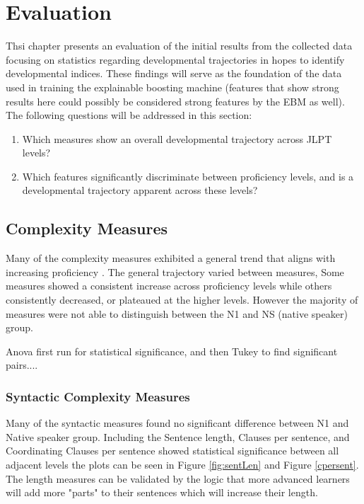 \chapter{Evaluation} 
Thsi chapter presents an evaluation of the initial results from the collected data focusing on statistics regarding
developmental trajectories in hopes to identify developmental indices. These findings will serve as the foundation
of the data used in training the explainable boosting machine (features that show strong results here could possibly
be considered strong features by the EBM as well). The following questions will be addressed in this
section:

\begin{enumerate}
    \item Which measures show an overall developmental trajectory across JLPT levels?
    \item Which features significantly discriminate between proficiency levels, and is a developmental trajectory
    apparent across these levels?
\end{enumerate}

\section{Complexity Measures}

Many of the complexity measures exhibited a general trend that aligns with increasing proficiency . The general
trajectory varied between measures, Some measures
showed a consistent increase across proficiency levels while others consistently decreased, or plateaued at the
higher levels. However the majority of measures were not able to distinguish between the N1 and NS (native speaker)
group.

Anova first run for statistical significance, and then Tukey to find significant pairs....

\subsection{Syntactic Complexity Measures}



Many of the syntactic measures found no significant difference between N1 and Native speaker group. Including the
 Sentence length, Clauses per sentence, and Coordinating Clauses per sentence showed statistical significance
between all
adjacent levels the plots can be seen in Figure \ref{fig:sentLen} and Figure \ref{cpersent}. The length measures can be
validated by
the
logic
that
more advanced
learners will add
more "parts"
to their sentences which will increase their length.

